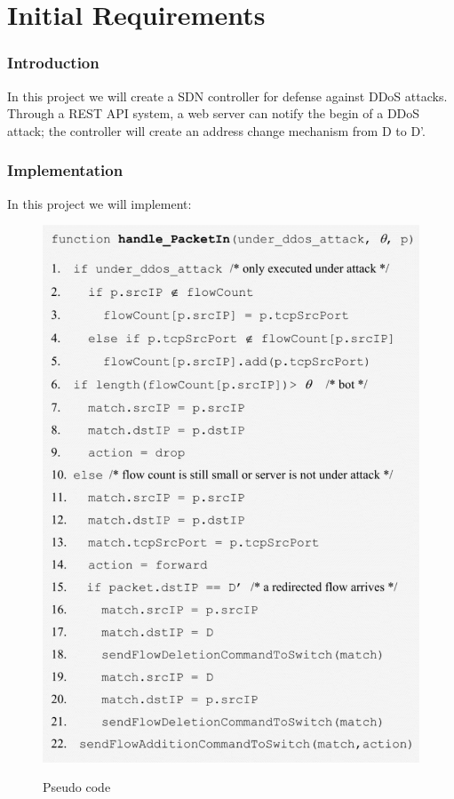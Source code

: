 \chapter{Initial Requirements}

\subsection{Introduction}
In this project we will create a SDN controller for defense against DDoS attacks. Through a REST API system, a web server can notify the begin of a DDoS attack; the controller will create an address change mechanism from D to D’.

\subsection{Implementation}
In this project we will implement:
\begin{figure}[H]
\begin{center}
\includegraphics[]{images/PseudoCode.png}
\label{fig:pseudocode}
\caption{Pseudo code}
\end{center}
\end{figure}

